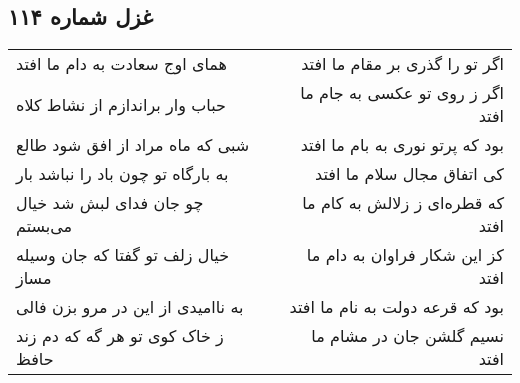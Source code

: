\begin{center}
\section*{غزل شماره ۱۱۴}
\label{sec:sh114}
\begin{longtable}{l p{0.5cm} r}
همای اوج سعادت به دام ما افتد
&&
اگر تو را گذری بر مقام ما افتد
\\
حباب وار براندازم از نشاط کلاه
&&
اگر ز روی تو عکسی به جام ما افتد
\\
شبی که ماه مراد از افق شود طالع
&&
بود که پرتو نوری به بام ما افتد
\\
به بارگاه تو چون باد را نباشد بار
&&
کی اتفاق مجال سلام ما افتد
\\
چو جان فدای لبش شد خیال می‌بستم
&&
که قطره‌ای ز زلالش به کام ما افتد
\\
خیال زلف تو گفتا که جان وسیله مساز
&&
کز این شکار فراوان به دام ما افتد
\\
به ناامیدی از این در مرو بزن فالی
&&
بود که قرعه دولت به نام ما افتد
\\
ز خاک کوی تو هر گه که دم زند حافظ
&&
نسیم گلشن جان در مشام ما افتد
\\
\end{longtable}
\end{center}
